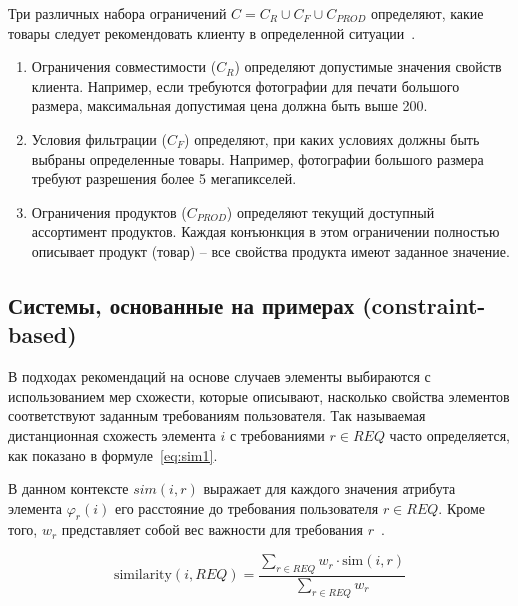 Три различных набора ограничений $C = C_R \cup C_F \cup C_{PROD}$ определяют, какие товары следует рекомендовать
клиенту в определенной ситуации~\cite{rek_intro}.

\begin{enumerate}
    \item Ограничения совместимости (\(C_R\)) определяют допустимые значения свойств клиента. Например, если требуются фотографии для печати большого размера, максимальная допустимая цена должна быть выше 200.
    \item Условия фильтрации (\(C_F\)) определяют, при каких условиях должны быть выбраны определенные товары. Например, фотографии большого размера требуют разрешения более 5 мегапикселей.
    \item Ограничения продуктов (\(C_{PROD}\)) определяют текущий доступный ассортимент продуктов. Каждая конъюнкция в этом ограничении полностью описывает продукт (товар) – все свойства продукта имеют заданное значение.
\end{enumerate}

\subsection*{Системы, основанные на примерах (constraint-based)}

В подходах рекомендаций на основе случаев элементы выбираются с использованием мер схожести,
которые описывают, насколько свойства элементов соответствуют заданным требованиям пользователя.
Так называемая дистанционная схожесть элемента \(i\) с требованиями \(r \in REQ\) часто определяется,
как показано в формуле~\ref{eq:sim1}.

В данном контексте \(sim(i, r)\) выражает для каждого значения атрибута элемента \(\varphi_r(i)\) его
расстояние до требования пользователя \(r \in REQ\).
Кроме того, \(w_r\) представляет собой вес важности для требования \(r\)~\cite{rek_intro}.

\begin{equation}
\text{similarity}(i, REQ) = \frac{\sum_{r \in REQ} w_r \cdot \text{sim}(i, r)}{\sum_{r \in REQ} w_r}
\label{eq:sim1}
\end{equation}

